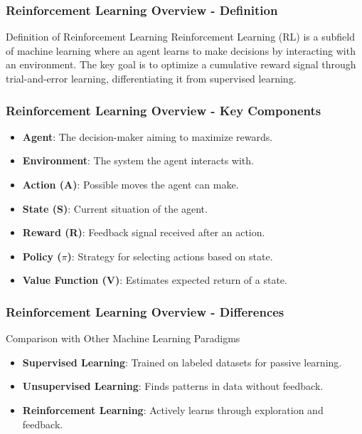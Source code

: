 \documentclass[aspectratio=169]{beamer}
\begin{document}
\begin{frame}[fragile]
    \frametitle{Reinforcement Learning Overview - Definition}
    \begin{block}{Definition of Reinforcement Learning}
        Reinforcement Learning (RL) is a subfield of machine learning where an agent learns to make decisions by interacting with an environment. The key goal is to optimize a cumulative reward signal through trial-and-error learning, differentiating it from supervised learning.
    \end{block}
\end{frame}

\begin{frame}[fragile]
    \frametitle{Reinforcement Learning Overview - Key Components}
    \begin{itemize}
        \item \textbf{Agent}: The decision-maker aiming to maximize rewards.
        \item \textbf{Environment}: The system the agent interacts with.
        \item \textbf{Action (A)}: Possible moves the agent can make.
        \item \textbf{State (S)}: Current situation of the agent.
        \item \textbf{Reward (R)}: Feedback signal received after an action.
        \item \textbf{Policy ($\pi$)}: Strategy for selecting actions based on state.
        \item \textbf{Value Function (V)}: Estimates expected return of a state.
    \end{itemize}
\end{frame}

\begin{frame}[fragile]
    \frametitle{Reinforcement Learning Overview - Differences}
    \begin{block}{Comparison with Other Machine Learning Paradigms}
        \begin{itemize}
            \item \textbf{Supervised Learning}: Trained on labeled datasets for passive learning.
            \item \textbf{Unsupervised Learning}: Finds patterns in data without feedback.
            \item \textbf{Reinforcement Learning}: Actively learns through exploration and feedback.
        \end{itemize}
    \end{block}
\end{frame}
\end{document}
